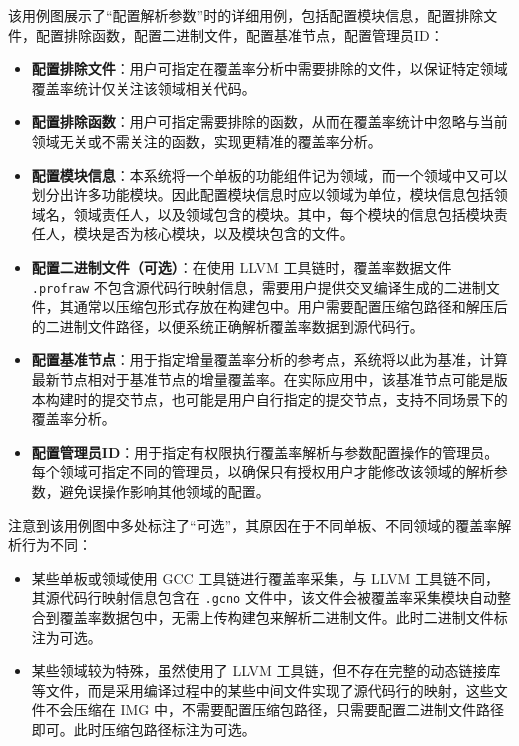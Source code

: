     该用例图展示了“配置解析参数”时的详细用例，包括配置模块信息，配置排除文件，配置排除函数，配置二进制文件，配置基准节点，配置管理员ID：
    \begin{itemize}
        \item \textbf{配置排除文件}：用户可指定在覆盖率分析中需要排除的文件，以保证特定领域覆盖率统计仅关注该领域相关代码。
        \item \textbf{配置排除函数}：用户可指定需要排除的函数，从而在覆盖率统计中忽略与当前领域无关或不需关注的函数，实现更精准的覆盖率分析。
        \item \textbf{配置模块信息}：本系统将一个单板的功能组件记为领域，而一个领域中又可以划分出许多功能模块。因此配置模块信息时应以领域为单位，模块信息包括领域名，领域责任人，以及领域包含的模块。其中，每个模块的信息包括模块责任人，模块是否为核心模块，以及模块包含的文件。
        \item \textbf{配置二进制文件（可选）}：在使用 LLVM 工具链时，覆盖率数据文件 \verb|.profraw| 不包含源代码行映射信息，需要用户提供交叉编译生成的二进制文件，其通常以压缩包形式存放在构建包中。用户需要配置压缩包路径和解压后的二进制文件路径，以便系统正确解析覆盖率数据到源代码行。
        \item \textbf{配置基准节点}：用于指定增量覆盖率分析的参考点，系统将以此为基准，计算最新节点相对于基准节点的增量覆盖率。在实际应用中，该基准节点可能是版本构建时的提交节点，也可能是用户自行指定的提交节点，支持不同场景下的覆盖率分析。
        \item \textbf{配置管理员ID}：用于指定有权限执行覆盖率解析与参数配置操作的管理员。每个领域可指定不同的管理员，以确保只有授权用户才能修改该领域的解析参数，避免误操作影响其他领域的配置。
    \end{itemize}

    注意到该用例图中多处标注了“可选”，其原因在于不同单板、不同领域的覆盖率解析行为不同：
    \begin{itemize}
        \item 某些单板或领域使用 GCC 工具链进行覆盖率采集，与 LLVM 工具链不同，其源代码行映射信息包含在 \verb|.gcno| 文件中，该文件会被覆盖率采集模块自动整合到覆盖率数据包中，无需上传构建包来解析二进制文件。此时二进制文件标注为可选。
        \item 某些领域较为特殊，虽然使用了 LLVM 工具链，但不存在完整的动态链接库等文件，而是采用编译过程中的某些中间文件实现了源代码行的映射，这些文件不会压缩在 IMG 中，不需要配置压缩包路径，只需要配置二进制文件路径即可。此时压缩包路径标注为可选。
    \end{itemize}

